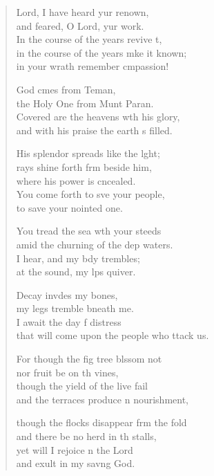 \settowidth{\versewidth}{that will come upon the people who attack us.}
\begin{verse}%
  \begin{patverse}
 Lord, I have heard yur renown,\Med\\
and feared, O Lord, yur work.\\
In the course of the years revive \pointup{\i}t,\Flex\\
in the course of the years mke it known;\Med\\
in your wrath remember cmpassion!

God cmes from Teman,\Med\\
the Holy One from Munt Paran.\\
Covered are the heavens w\pointup{\i}th his glory,\Med\\
and with his praise the earth \pointup{\i}s filled.

His splendor spreads like the l\pointup{\i}ght;\Flex\\
rays shine forth frm beside him,\Med\\
where his power is cncealed.\\
You come forth to sve your people,\Med\\
to save your nointed one.

You tread the sea w\pointup{\i}th your steeds\Med\\
amid the churning of the dep waters.\\
I hear, and my bdy trembles;\Med\\
at the sound, my l\pointup{\i}ps quiver.

Decay invdes my bones,\Med\\
my legs tremble bneath me.\\
I await the day f distress\Med\\
that will come upon the people who ttack us.

For though the fig tree blssom not\Med\\
nor fruit be on th vines,\\
though the yield of the live fail\Med\\
and the terraces produce n nourishment,

though the flocks disappear frm the fold\Med\\
and there be no herd in th stalls,\\
yet will I rejoice \pointup{\i}n the Lord\Med\\
and exult in my sav\pointup{\i}ng God.


\end{patverse}
\end{verse}

